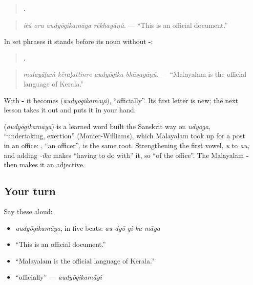 \begin{quote}
\textbf{   .}
\end{quote}

\begin{quote}
\emph{itŭ oru audyōgikamāya rēkhayāṇŭ.} — \textquotedblleft{}This is an official document.\textquotedblright{}
\end{quote}

In set phrases it stands before its noun without \textbf{-}:

\begin{quote}
\textbf{   .}
\end{quote}

\begin{quote}
\emph{malayāḷaṁ kēraḷattinṟe audyōgika bhāṣayāṇŭ.} — \textquotedblleft{}Malayalam is the official language of Kerala.\textquotedblright{}
\end{quote}

With \textbf{-} it becomes \textbf{} (\emph{audyōgikamāyi}), \textquotedblleft{}officially\textquotedblright{}. Its first letter is new; the next lesson takes it out and puts it in your hand.

\begin{cousinweb}
\textbf{} (\emph{audyōgikamāya}) is a learned word built the Sanskrit way on \emph{udyoga}, \textquotedblleft{}undertaking, exertion\textquotedblright{} (Monier-Williams), which Malayalam took up for a post in an office: \textbf{}, \textquotedblleft{}an officer\textquotedblright{}, is the same root. Strengthening the first vowel, \emph{u} to \emph{au}, and adding \emph{-ika} makes \textquotedblleft{}having to do with\textquotedblright{} it, so \textquotedblleft{}of the office\textquotedblright{}. The Malayalam \textbf{-} then makes it an adjective.
\end{cousinweb}

\subsection*{Your turn}
Say these aloud:

\begin{itemize}
\raggedright
  \item \emph{audyōgikamāya}, in five beats: \emph{au-dyō-gi-ka-māya}
  \item \textquotedblleft{}This is an official document.\textquotedblright{}
  \item \textquotedblleft{}Malayalam is the official language of Kerala.\textquotedblright{}
  \item \textquotedblleft{}officially\textquotedblright{} — \emph{audyōgikamāyi}
\end{itemize}

